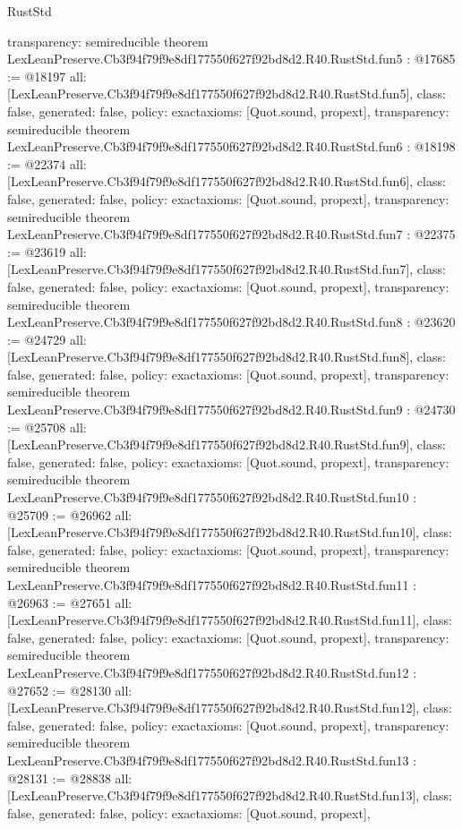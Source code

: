\begin{lexlean}{RustStd}
\begin{coremodule}
{  transparency: semireducible
}
theorem LexLeanPreserve.Cb3f94f79f9e8df177550f627f92bd8d2.R40.RustStd.fun5 : @17685 := @18197 {
  all: [LexLeanPreserve.Cb3f94f79f9e8df177550f627f92bd8d2.R40.RustStd.fun5],
  class: false,
  generated: false,
  policy: exact{axioms: [Quot.sound, propext]},
  transparency: semireducible
}
theorem LexLeanPreserve.Cb3f94f79f9e8df177550f627f92bd8d2.R40.RustStd.fun6 : @18198 := @22374 {
  all: [LexLeanPreserve.Cb3f94f79f9e8df177550f627f92bd8d2.R40.RustStd.fun6],
  class: false,
  generated: false,
  policy: exact{axioms: [Quot.sound, propext]},
  transparency: semireducible
}
theorem LexLeanPreserve.Cb3f94f79f9e8df177550f627f92bd8d2.R40.RustStd.fun7 : @22375 := @23619 {
  all: [LexLeanPreserve.Cb3f94f79f9e8df177550f627f92bd8d2.R40.RustStd.fun7],
  class: false,
  generated: false,
  policy: exact{axioms: [Quot.sound, propext]},
  transparency: semireducible
}
theorem LexLeanPreserve.Cb3f94f79f9e8df177550f627f92bd8d2.R40.RustStd.fun8 : @23620 := @24729 {
  all: [LexLeanPreserve.Cb3f94f79f9e8df177550f627f92bd8d2.R40.RustStd.fun8],
  class: false,
  generated: false,
  policy: exact{axioms: [Quot.sound, propext]},
  transparency: semireducible
}
theorem LexLeanPreserve.Cb3f94f79f9e8df177550f627f92bd8d2.R40.RustStd.fun9 : @24730 := @25708 {
  all: [LexLeanPreserve.Cb3f94f79f9e8df177550f627f92bd8d2.R40.RustStd.fun9],
  class: false,
  generated: false,
  policy: exact{axioms: [Quot.sound, propext]},
  transparency: semireducible
}
theorem LexLeanPreserve.Cb3f94f79f9e8df177550f627f92bd8d2.R40.RustStd.fun10 : @25709 := @26962 {
  all: [LexLeanPreserve.Cb3f94f79f9e8df177550f627f92bd8d2.R40.RustStd.fun10],
  class: false,
  generated: false,
  policy: exact{axioms: [Quot.sound, propext]},
  transparency: semireducible
}
theorem LexLeanPreserve.Cb3f94f79f9e8df177550f627f92bd8d2.R40.RustStd.fun11 : @26963 := @27651 {
  all: [LexLeanPreserve.Cb3f94f79f9e8df177550f627f92bd8d2.R40.RustStd.fun11],
  class: false,
  generated: false,
  policy: exact{axioms: [Quot.sound, propext]},
  transparency: semireducible
}
theorem LexLeanPreserve.Cb3f94f79f9e8df177550f627f92bd8d2.R40.RustStd.fun12 : @27652 := @28130 {
  all: [LexLeanPreserve.Cb3f94f79f9e8df177550f627f92bd8d2.R40.RustStd.fun12],
  class: false,
  generated: false,
  policy: exact{axioms: [Quot.sound, propext]},
  transparency: semireducible
}
theorem LexLeanPreserve.Cb3f94f79f9e8df177550f627f92bd8d2.R40.RustStd.fun13 : @28131 := @28838 {
  all: [LexLeanPreserve.Cb3f94f79f9e8df177550f627f92bd8d2.R40.RustStd.fun13],
  class: false,
  generated: false,
  policy: exact{axioms: [Quot.sound, propext]},
}
\end{coremodule}
\end{lexlean}
